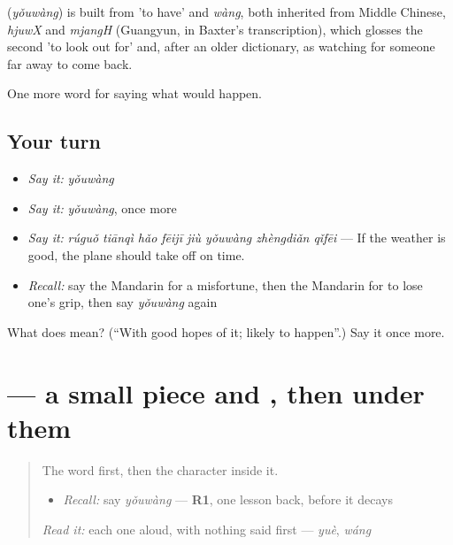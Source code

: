 \begin{cousinweb}
\textbf{} (\emph{yǒuwàng}) is built from  'to have' and \emph{wàng}, both inherited from Middle Chinese, \emph{hjuwX} and \emph{mjangH} (Guangyun, in Baxter's transcription), which glosses the second 'to look out for' and, after an older dictionary, as watching for someone far away to come back.
\end{cousinweb}

\begin{grammarlens}[title={What you've built}]
One more word for saying what would happen.
\end{grammarlens}

\subsection*{Your turn}
\begin{itemize}
\raggedright
  \item \emph{Say it:} \emph{yǒuwàng}
  \item \emph{Say it:} \emph{yǒuwàng}, once more
  \item \emph{Say it:} \emph{rúguǒ tiānqì hǎo fēijī jiù yǒuwàng zhèngdiǎn qǐfēi} — If the weather is good, the plane should take off on time.
  \item \emph{Recall:} say the Mandarin for a misfortune, then the Mandarin for to lose one's grip, then say \emph{yǒuwàng} again
\end{itemize}

\begin{tcolorbox}[breakable,colback=teal!4,colframe=teal!35!black,title={Before you move on}]
What does  mean? (\textquotedblleft{}With good hopes of it; likely to happen\textquotedblright{}.) Say it once more.
\end{tcolorbox}
\section[\texorpdfstring{\zh{望} (wàng)}{望 (wàng)}]{ — a small piece and , then  under them}

\label{lesson:ZH-W532-wang-hope}



\begin{quote}
The word first, then the character inside it.

\begin{itemize}
\raggedright
  \item \emph{Recall:} say \emph{yǒuwàng} — \textbf{R1}, one lesson back, before it decays
\end{itemize}

\begin{quote}
 
\end{quote}

\emph{Read it:} each one aloud, with nothing said first — \emph{yuè}, \emph{wáng}
\end{quote}

